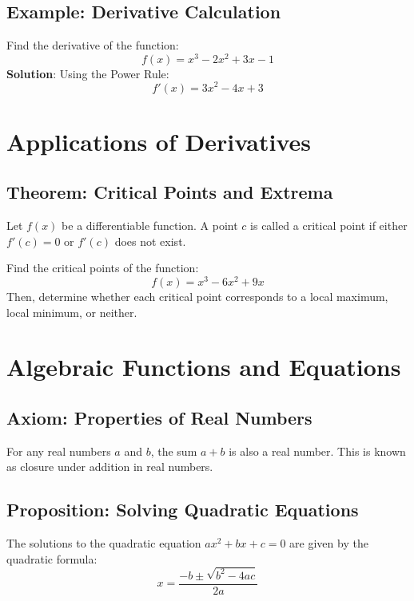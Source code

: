 \subsection{Example: Derivative Calculation}
\begin{example}
Find the derivative of the function:
\[
f(x) = x^3 - 2x^2 + 3x - 1
\]
\textbf{Solution}: Using the Power Rule:
\[
f'(x) = 3x^2 - 4x + 3
\]
\end{example}


\section{Applications of Derivatives}

\subsection{Theorem: Critical Points and Extrema}
\begin{theorem}
Let $f(x)$ be a differentiable function. A point $c$ is called a critical point if either $f'(c) = 0$ or $f'(c)$ does not exist.
\end{theorem}


\begin{exercise}
Find the critical points of the function:
\[
f(x) = x^3 - 6x^2 + 9x
\]
Then, determine whether each critical point corresponds to a local maximum, local minimum, or neither.
\end{exercise}


\section{Algebraic Functions and Equations}

\subsection{Axiom: Properties of Real Numbers}
\begin{axioma}
For any real numbers $a$ and $b$, the sum $a + b$ is also a real number. This is known as closure under addition in real numbers.
\end{axioma}

\subsection{Proposition: Solving Quadratic Equations}
\begin{prop}
The solutions to the quadratic equation $ax^2 + bx + c = 0$ are given by the quadratic formula:
\[
x = \frac{-b \pm \sqrt{b^2 - 4ac}}{2a}
\]
\end{prop}

